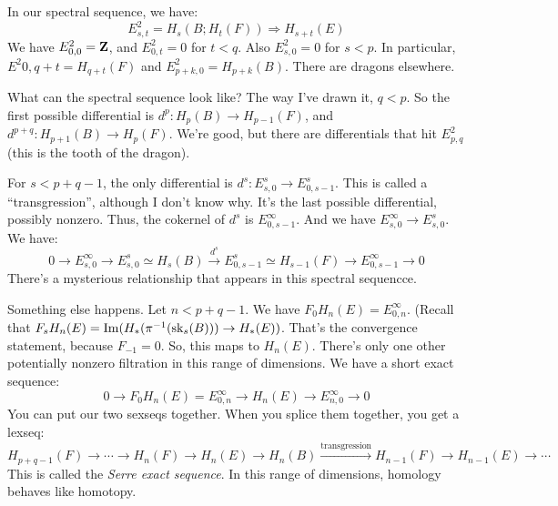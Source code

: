 In our spectral sequence, we have:
$$
E^2_{s,t} = H_s(B;H_t(F)) \Rightarrow H_{s+t}(E)
$$
We have $E^2_{0,0}=\mathbf Z$, and $E^2_{0,t} = 0$ for $t<q$.
Also $E^2_{s,0} = 0$ for $s<p$.
In particular, $E^2{0,q+t} = H_{q+t}(F)$ and $E^2_{p+k,0} = H_{p+k}(B)$.
There are dragons elsewhere.

What can the spectral sequence look like?
The way I've drawn it, $q<p$.
So the first possible differential is $d^{p}:H_p(B) \to H_{p-1}(F)$, and $d^{p+q}:H_{p+1}(B)\to H_{p}(F)$.
We're good, but there are differentials that hit $E^2_{p,q}$ (this is the tooth of the dragon).

For $s<p+q-1$, the only differential is $d^s:E^s_{s,0}\to E^s_{0,s-1}$.
This is called a ``transgression'', although I don't know why.
It's the last possible differential, possibly nonzero.
Thus, the cokernel of $d^s$ is $E^\infty_{0,s-1}$.
And we have $E^\infty_{s,0}\to E^s_{s,0}$.
We have:
$$
0\to E^\infty_{s,0}\to E^s_{s,0} \simeq H_s(B) \xrightarrow{d^s} E^s_{0,s-1}\simeq H_{s-1}(F) \to E^\infty_{0,s-1}\to 0
$$
There's a mysterious relationship that appears in this spectral sequencce.

Something else happens.
Let $n<p+q-1$.
We have $F_0 H_n(E) = E^\infty_{0,n}$.
(Recall that $F_s H_n(E) = \operatorname{Im}(H_\ast(\pi^{-1}(\mathrm{sk}_s(B)))\to H_\ast(E))$.
That's the convergence statement, because $F_{-1} = 0$.
So, this maps to $H_n(E)$.
There's only one other potentially nonzero filtration in this range of dimensions.
We have a short exact sequence:
$$
0\to F_0 H_n(E) = E^\infty_{0,n} \to H_n(E) \to E^\infty_{n,0} \to 0
$$
You can put our two sexseqs together.
When you splice them together, you get a lexseq:
$$
H_{p+q-1}(F)\to \cdots\to H_n(F)\to H_n(E)\to H_n(B) \xrightarrow{\text{transgression}} H_{n-1}(F) \to H_{n-1}(E)\to \cdots
$$
This is called the \emph{Serre exact sequence}.
In this range of dimensions, homology behaves like homotopy.
